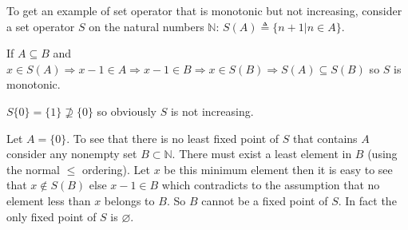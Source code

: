 \documentclass[10pt]{article}
\newcommand{\defined}{\triangleq}
\begin{document}
To get an example of set operator that is monotonic but not increasing, consider a set operator $S$ on the natural numbers $\mathbb{N}$: $S (A)\defined \{n+1 | n \in A\}$.

If $A \subseteq B$ and $x \in S(A) \Rightarrow x-1 \in A \Rightarrow x-1 \in B \Rightarrow x \in S(B) \Rightarrow S(A) \subseteq S(B)$ so $S$ is monotonic.

$S\{0\} = \{1\} \nsupseteq \{0\}$ so obviously $S$ is not increasing.

Let $A = \{0\}$. To see that there is no least fixed point of $S$ that contains $A$ consider any nonempty set $B \subset \mathbb{N}$. There must exist a least element in $B$ (using the normal $\leq$ ordering). Let $x$ be this minimum element then it is easy to see that $x \notin S(B)$ else $x-1 \in B$ which contradicts to the assumption that no element less than $x$ belongs to $B$. So $B$ cannot be a fixed point of $S$. In fact the only fixed point of $S$ is $\varnothing$.
\end{document}
